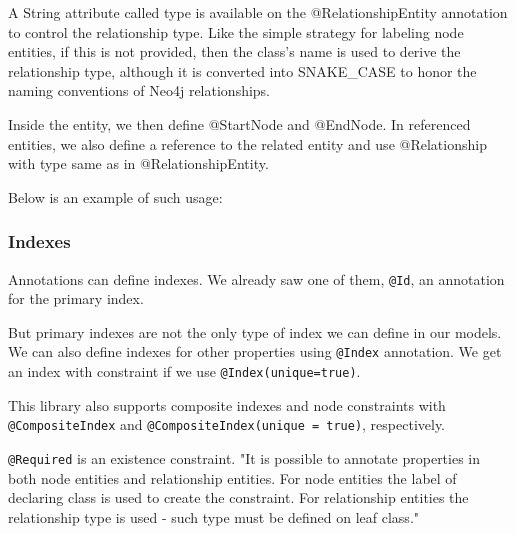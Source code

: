 \documentclass[thesis=M,english]{FITthesis}[2019/12/23]
\begin{document}
A String attribute called type is available on the @RelationshipEntity annotation to control the relationship type. Like the simple strategy for labeling node entities,
if this is not provided, then the class's name is used to derive the relationship type, although it is converted into SNAKE\_CASE to honor
the naming conventions of Neo4j relationships. \cite{noauthor_reference_nodate}

Inside the entity, we then define @StartNode and @EndNode. In referenced entities, we also define a reference to
the related entity and use @Relationship with type same as in @RelationshipEntity.

Below is an example of such usage:


\subsubsection {Indexes}

Annotations can define indexes. We already saw one of them, \texttt{@Id}, an annotation for the primary index.

But primary indexes are not the only type of index we can define in our models. We can also define indexes for other
properties using \texttt{@Index} annotation. We get an index with constraint if we use \texttt{@Index(unique=true)}.

This library also supports composite indexes and node constraints with \texttt{@CompositeIndex} and \texttt{@CompositeIndex(unique = true)}, respectively.

\texttt{@Required} is an existence constraint. "It is possible to annotate properties in both node entities and relationship entities. For node entities
the label of declaring class is used to create the constraint. For relationship entities the relationship type is used - such type must be defined on leaf class." \cite{noauthor_reference_nodate}
\end{document}
